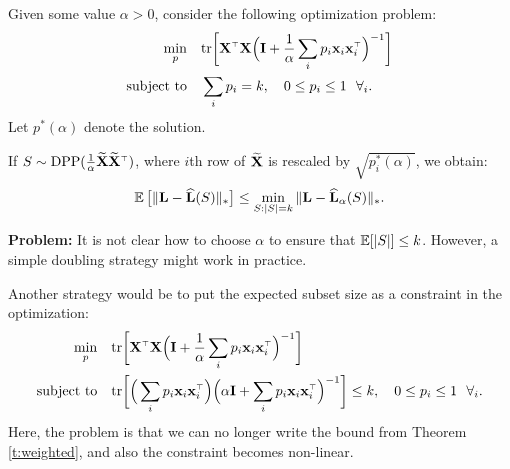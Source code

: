 \documentclass[12pt]{sty/colt2019/colt2018-arxiv}
\begin{document}
Given some value $\alpha>0$, consider the following optimization problem:
\begin{align*}
  \min_p\quad
  &
  \tr\bigg[\X^\top\X\Big(\I+\frac1\alpha\sum_ip_i\x_i\x_i^\top\Big)^{-1}\bigg]\\
  \text{subject to}\quad
  &\sum_i p_i = k,
\quad 0\leq p_i\leq 1 \ \ \forall_i.
\end{align*}
Let $p^*(\alpha)$ denote the solution.%

\begin{theorem}\label{t:weighted}
If $S\sim\DPP(\frac1{\alpha}\Xt\Xt^\top)$, where $i$th
row of $\widetilde{\mathbf{X}}$ is rescaled by $\sqrt{p_i^*(\alpha)}$, we obtain:
\begin{align*}
  \mathbb E\,\big[\|\mathbf{L}-\widehat{\mathbf{L}}(S)\|_*\big] \leq \min_{S:|S|=k} \|\mathbf{L} -
  \widehat{\mathbf{L}}_{\alpha}(S)\|_*.
\end{align*}
\end{theorem}
\textbf{Problem:} It is not clear how to choose $\alpha$ to ensure
that $\mathbb E[|S|]\leq k$. However, a simple doubling strategy might work in
practice.

Another strategy would be to put the expected subset size as a
constraint in the optimization:
\begin{align*}
  \min_p\quad
  &
  \tr\bigg[\X^\top\X\Big(\I+\frac1\alpha\sum_ip_i\x_i\x_i^\top\Big)^{-1}\bigg]\\
  \text{subject to}\quad
  & \tr\bigg[\Big(\sum_ip_i\x_i\x_i^\top\Big)\Big(\alpha\I + \sum_i
 p_i\x_i\x_i^\top\Big)^{-1}\bigg]\leq k,
\quad 0\leq p_i\leq 1 \ \ \forall_i.
\end{align*}
Here, the problem is that we can no longer write the bound from
Theorem \ref{t:weighted}, and also the constraint becomes non-linear.
\end{document}
